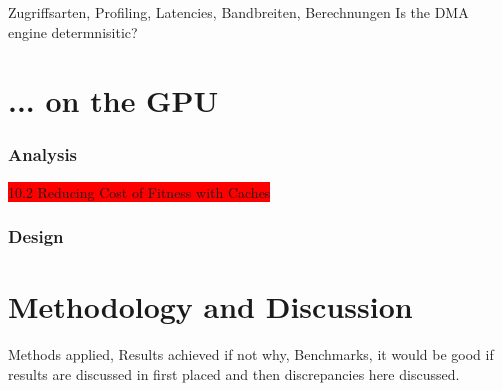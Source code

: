 Zugriffsarten, Profiling, Latencies, Bandbreiten, Berechnungen
Is the DMA engine determnisitic?


\section{... on the GPU} %
\label{sec:_on_the_gpu}
\subsubsection{Analysis} %



\colorbox{red}{10.2 Reducing Cost of Fitness with Caches}

\label{ssub:analysis}

\subsubsection{Design} %
\label{ssub:design}


\section{Methodology and Discussion} %
\label{sec:appraisal_of_achievement}
Methods applied, Results achieved if not why, 
Benchmarks, it would be good if results are discussed in first placed
and then discrepancies here discussed.

